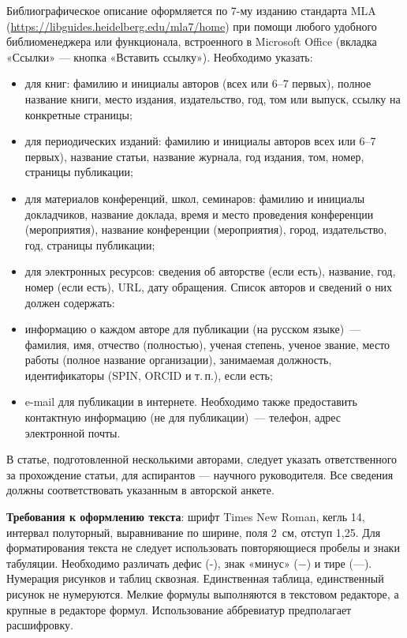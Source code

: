 \begin{multicols}{2}
{Библиографическое описание} оформляется по 7-му изданию стандарта MLA
(\url{https://libguides.heidelberg.edu/mla7/home})
при помощи любого удобного библиоменеджера или функционала, встроенного в Microsoft Office (вкладка «Ссылки» — кнопка «Вставить ссылку»). Необходимо указать:
\begin{itemize}
\item для книг: фамилию и инициалы авторов
(всех или 6--7 первых), полное название
книги, место издания, издательство, год,
том или выпуск, ссылку на конкретные
страницы;
\item  для периодических изданий: фамилию
и инициалы авторов всех или 6--7 первых), название статьи, название журнала,
год издания, том, номер, страницы публикации;
\item  для материалов конференций, школ, семинаров: фамилию и инициалы докладчиков, название доклада, время и место
проведения конференции (мероприятия), название конференции (мероприятия), город, издательство, год, страницы
публикации;
\item  для электронных ресурсов: сведения об
авторстве (если есть), название, год,
номер (если есть), URL, дату обращения.
Список авторов и сведений о них должен
содержать:
\item  информацию о каждом авторе для публикации (на русском языке) — фамилия,
имя, отчество (полностью), ученая степень, ученое звание, место работы (полное название организации), занимаемая должность, идентификаторы (SPIN,
ORCID и т.\,п.), если есть;
\item  e-mail для публикации в интернете.
Необходимо также предоставить контактную информацию (не для публикации) — 
телефон, адрес электронной почты.
\end{itemize}

В статье, подготовленной несколькими
авторами, следует указать ответственного
за прохождение статьи, для аспирантов —
научного руководителя. Все сведения
должны соответствовать указанным
в авторской анкете.

\textbf{Требования к оформлению текста}: шрифт
Times New Roman, кегль 14, интервал
полуторный, выравнивание по ширине,
поля 2 см, отступ 1,25. Для форматирования
текста не следует использовать повторяющиеся пробелы и знаки табуляции. Необходимо различать дефис (-), знак «минус» (−)
и тире (—). Нумерация рисунков и таблиц
сквозная. Единственная таблица, единственный рисунок не нумеруются. Мелкие
формулы выполняются в текстовом редакторе, а крупные в редакторе формул.
Использование аббревиатур предполагает
расшифровку.


\end{multicols}
